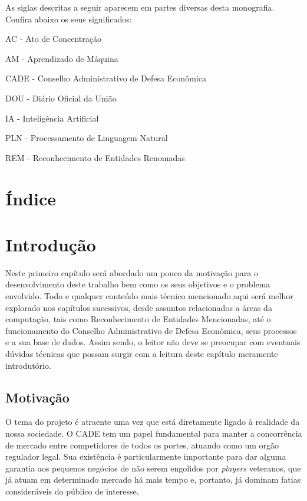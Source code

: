 \documentclass[11pt]{report}
\begin{document}
\indent\indent As siglas descritas a seguir aparecem em partes diversas desta monografia. Confira abaixo
os seus significados:

\vspace*{20px}

\noindent AC - Ato de Concentração

\vspace*{8px}
\noindent AM - Aprendizado de Máquina

\vspace*{8px}
\noindent CADE - Conselho Administrativo de Defesa Econômica

\vspace*{8px}
\noindent DOU - Diário Oficial da União

\vspace*{8px}
\noindent IA - Inteligência Artificial

\vspace*{8px}
\noindent PLN - Processamento de Linguagem Natural

\vspace*{8px}
\noindent REM - Reconhecimento de Entidades Renomadas

\pagebreak
\thispagestyle{empty}
\chapter*{Índice}

\pagebreak
\chapter{Introdução}
\indent\indent Neste primeiro capítulo será abordado um pouco da motivação para o desenvolvimento deste trabalho bem como os seus objetivos e o problema envolvido.
Todo e qualquer conteúdo mais técnico mencionado aqui será melhor explorado nos capítulos sucessivos, desde assuntos relacionados a áreas da computação, tais como
Reconhecimento de Entidades Mencionadas, até o funcionamento do Conselho Administrativo de Defesa Econômica, seus processos e a sua base de dados. Assim sendo, o
leitor não deve se preocupar com eventuais dúvidas técnicas que possam surgir com a leitura deste capítulo meramente introdutório.

\section{Motivação}
\indent\indent O tema do projeto é atraente uma vez que está diretamente ligado à realidade da nossa sociedade. O CADE tem um papel
fundamental para manter a concorrência de mercado entre competidores de todos os portes, atuando como um orgão regulador legal. Sua existência é
particularmente importante para dar alguma garantia aos pequenos negócios de não serem engolidos por \textit{players} veteranos, que
já atuam em determinado mercado há mais tempo e, portanto, já dominam fatias consideráveis do público de interesse.
\end{document}
